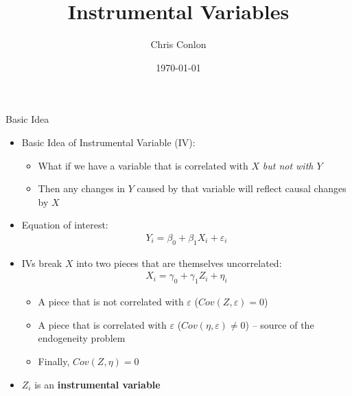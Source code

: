\documentclass[aspectratio=169,11pt]{beamer}
\title{Instrumental Variables}
\author{Chris Conlon}
\institute{Applied Econometrics}
\date{\today}
\begin{document}
\maketitle

\begin{frame}{Basic Idea}
\begin{itemize}
	\item Basic Idea of Instrumental Variable (IV):
		\begin{itemize}
			\item What if we have a variable that is correlated with $X$ \emph{but not with $Y$}
			\item Then any changes in $Y$ caused by that variable will reflect causal changes by $X$
		\end{itemize}
\medskip
\item Equation of interest:
\begin{align*}
	Y_i = \beta_0 + \beta_1 X_i + \varepsilon_i
\end{align*}
	\item IVs break $X$ into two pieces that are themselves uncorrelated:
		\begin{align*}
			X_i =\gamma_0 + \gamma_1  Z_i + \eta_i
		\end{align*}

		\begin{itemize}
			\item A piece that is not correlated with $\varepsilon$ ($Cov(Z,\varepsilon)=0$)
			\item A piece that is correlated with $\varepsilon$ ($Cov(\eta,\varepsilon)\ne0$) -- source of the endogeneity problem
			\item Finally, $Cov(Z,\eta)=0$
		\end{itemize}
	\item $Z_i$ is an {\bf instrumental variable}
\end{itemize}
\end{frame}
\end{document}
